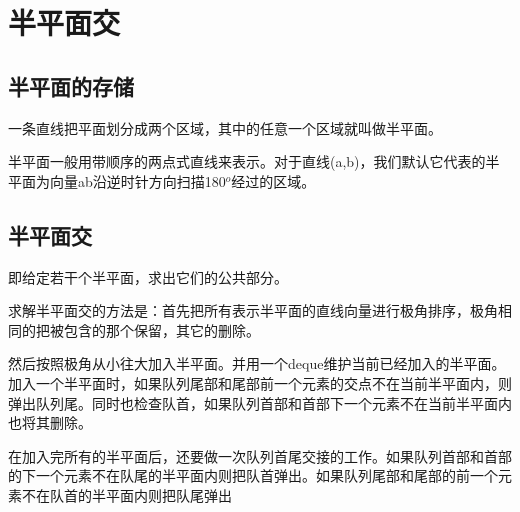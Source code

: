 \section{半平面交}

\subsection{半平面的存储}
\begin{frame}
\pause
一条直线把平面划分成两个区域，其中的任意一个区域就叫做半平面。

\pause
半平面一般用带顺序的两点式直线来表示。对于直线(a,b)，我们默认它代表的半平面为向量ab沿逆时针方向扫描180$^{o}$经过的区域。
\end{frame}

\subsection{半平面交}
\begin{frame}
\pause
即给定若干个半平面，求出它们的公共部分。

\pause
求解半平面交的方法是：首先把所有表示半平面的直线向量进行极角排序，极角相同的把被包含的那个保留，其它的删除。

\pause
然后按照极角从小往大加入半平面。并用一个deque维护当前已经加入的半平面。加入一个半平面时，如果队列尾部和尾部前一个元素的交点不在当前半平面内，则弹出队列尾。同时也检查队首，如果队列首部和首部下一个元素不在当前半平面内也将其删除。

\pause
在加入完所有的半平面后，还要做一次队列首尾交接的工作。如果队列首部和首部的下一个元素不在队尾的半平面内则把队首弹出。如果队列尾部和尾部的前一个元素不在队首的半平面内则把队尾弹出
\end{frame}